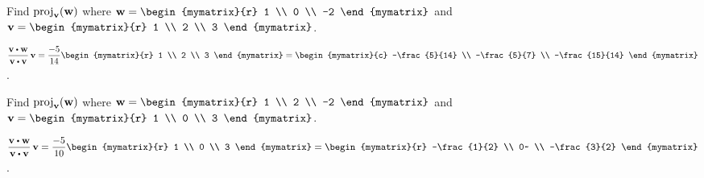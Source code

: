 \begin{ex}
  Find $\proj_{\vect{v}}(\vect{w})$ where
  $\vect{w}=\begin{mymatrix}{r}
    1 \\
    0 \\
    -2
  \end{mymatrix}$ and $\vect{v}=\begin{mymatrix}{r}
    1 \\
    2 \\
    3
  \end{mymatrix}$.
  \begin{sol}
    $\displaystyle
    \def\arraystretch{1.2}
    \frac{\vect{v}\dotprod \vect{w}}{\vect{v}\dotprod
      \vect{v}}\,\vect{v}=\frac{-5}{14}\begin{mymatrix}{r}
      1 \\
      2 \\
      3
    \end{mymatrix} =\begin{mymatrix}{c}
      -\frac{5}{14} \\
      -\frac{5}{7} \\
      -\frac{15}{14}
    \end{mymatrix}$.
  \end{sol}
\end{ex}

\begin{ex}
  Find $\proj_{\vect{v}}(\vect{w})$ where
  $\vect{w}=\begin{mymatrix}{r}
    1 \\
    2 \\
    -2
  \end{mymatrix}$ and $\vect{v}=\begin{mymatrix}{r}
    1 \\
    0 \\
    3
  \end{mymatrix}$.
  \begin{sol}
    $\displaystyle
    \def\arraystretch{1.2}
    \frac{\vect{v}\dotprod \vect{w}}{\vect{v}\dotprod
      \vect{v}}\,\vect{v}=\frac{-5}{10}\begin{mymatrix}{r}
      1 \\
      0 \\
      3
    \end{mymatrix} =\begin{mymatrix}{r}
      -\frac{1}{2} \\
      0~ \\
      -\frac{3}{2}
    \end{mymatrix}$.
  \end{sol}
\end{ex}

